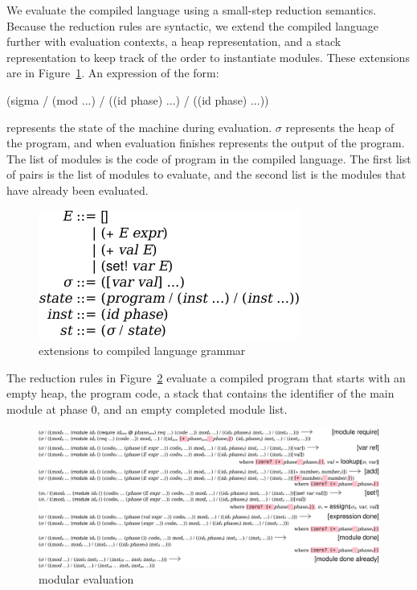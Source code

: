 We evaluate the compiled language using a small-step reduction semantics. 
Because the reduction rules are syntactic, we extend the compiled language further with evaluation contexts, a heap representation, and a stack representation to keep track of the order to instantiate modules.
These extensions are in Figure~\ref{compiled-eval-lang}.
An expression of the form:
\begin{schemedisplay}
(sigma / (mod ...) / ((id phase) ...)  / ((id phase) ...))
\end{schemedisplay}
represents the state of the machine during evaluation.
$\sigma$ represents the heap of the program, and when evaluation finishes represents the output of the program.
The list of modules is the code of program in the compiled language.
The first list of  pairs is the list of modules to evaluate, and the second list is the modules that have already been evaluated.

\begin{figure}[h]
\includegraphics{compiled-eval-lang}
\caption{extensions to compiled language grammar}
\label{compiled-eval-lang}
\end{figure}

The reduction rules in Figure~\ref{eval-reduction} evaluate a compiled program that starts with an empty heap, the program code, a stack that contains the identifier of the main module at phase 0, and an empty completed module list. 

\begin{figure}[h]
\includegraphics[width=\textwidth]{eval-reduction}
\caption{modular evaluation}
\label{eval-reduction}
\end{figure}

